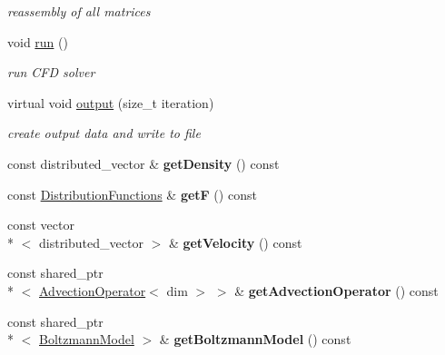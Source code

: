 \begin{DoxyCompactItemize}
\begin{DoxyCompactList}\small\item\em reassembly of all matrices \end{DoxyCompactList}\item 
\hypertarget{classnatrium_1_1CFDSolver_a11f503bc3f3c306b240874c74a38025b}{void \hyperlink{classnatrium_1_1CFDSolver_a11f503bc3f3c306b240874c74a38025b}{run} ()}\label{classnatrium_1_1CFDSolver_a11f503bc3f3c306b240874c74a38025b}

\begin{DoxyCompactList}\small\item\em run C\-F\-D solver \end{DoxyCompactList}\item 
virtual void \hyperlink{classnatrium_1_1CFDSolver_abf6804f132885502b61877fc1f9ca4a2}{output} (size\-\_\-t iteration)
\begin{DoxyCompactList}\small\item\em create output data and write to file \end{DoxyCompactList}\item 
\hypertarget{classnatrium_1_1CFDSolver_adf0b4e4da292bcb195d926d3174ba2a9}{const distributed\-\_\-vector \& {\bfseries get\-Density} () const }\label{classnatrium_1_1CFDSolver_adf0b4e4da292bcb195d926d3174ba2a9}

\item 
\hypertarget{classnatrium_1_1CFDSolver_a963e069873d88d130b0fe3f7f77c3d83}{const \hyperlink{classnatrium_1_1DistributionFunctions}{Distribution\-Functions} \& {\bfseries get\-F} () const }\label{classnatrium_1_1CFDSolver_a963e069873d88d130b0fe3f7f77c3d83}

\item 
\hypertarget{classnatrium_1_1CFDSolver_a0e5ec3dc278216d5827410b7db82af59}{const vector\\*
$<$ distributed\-\_\-vector $>$ \& {\bfseries get\-Velocity} () const }\label{classnatrium_1_1CFDSolver_a0e5ec3dc278216d5827410b7db82af59}

\item 
\hypertarget{classnatrium_1_1CFDSolver_a1aea207c81089c2e46092489557bb139}{const shared\-\_\-ptr\\*
$<$ \hyperlink{classnatrium_1_1AdvectionOperator}{Advection\-Operator}$<$ dim $>$ $>$ \& {\bfseries get\-Advection\-Operator} () const }\label{classnatrium_1_1CFDSolver_a1aea207c81089c2e46092489557bb139}

\item 
\hypertarget{classnatrium_1_1CFDSolver_a3733dbd256b6d38659cee3cb044c1446}{const shared\-\_\-ptr\\*
$<$ \hyperlink{classnatrium_1_1BoltzmannModel}{Boltzmann\-Model} $>$ \& {\bfseries get\-Boltzmann\-Model} () const }\label{classnatrium_1_1CFDSolver_a3733dbd256b6d38659cee3cb044c1446}


\end{DoxyCompactItemize}
